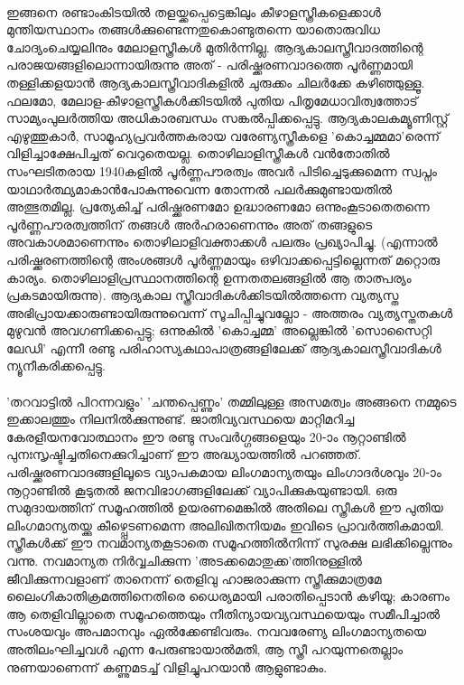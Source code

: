 \paragraph{}ഇങ്ങനെ രണ്ടാംകിടയിൽ തളയ്ക്കപ്പെട്ടെങ്കിലും കീഴാളസ്ത്രീകളെക്കാൾ മുന്തിയസ്ഥാനം തങ്ങൾക്കുണ്ടെന്നതുകൊണ്ടുതന്നെ യാതൊരുവിധ ചോദ്യംചെയ്യലിനും മേലാളസ്ത്രീകൾ മുതിർന്നില്ല. ആദ്യകാലസ്ത്രീവാദത്തിന്റെ പരാജയങ്ങളിലൊന്നായിരുന്നു അത് - പരിഷ്ക്കരണവാദത്തെ പൂർണ്ണമായി തള്ളിക്കളയാൻ ആദ്യകാലസ്ത്രീവാദികളിൽ ചുരുക്കം ചിലർക്കേ കഴിഞ്ഞുള്ളൂ. ഫലമോ, മേലാള-കീഴാളസ്ത്രീകൾക്കിടയിൽ പുതിയ പിതൃമേധാവിത്വത്തോട് സാമ്യംപുലർത്തിയ അധികാരബന്ധം സങ്കൽപ്പിക്കപ്പെട്ടു. ആദ്യകാലകമ്യൂണിസ്റ്റ് എഴുത്തുകാർ, സാമൂഹ്യപ്രവർത്തകരായ വരേണ്യസ്ത്രീകളെ 'കൊച്ചമ്മമാ'രെന്ന് വിളിച്ചാക്ഷേപിച്ചത് വെറുതെയല്ല. തൊഴിലാളിസ്ത്രീകൾ വൻതോതിൽ സംഘടിതരായ 1940കളിൽ പൂർണ്ണപൗരത്വം അവർ പിടിച്ചെടുക്കുമെന്ന സ്വപ്നം യാഥാർത്ഥ്യമാകാൻപോകുന്നുവെന്ന തോന്നൽ പലർക്കുമുണ്ടായതിൽ അത്ഭുതമില്ല. പ്രത്യേകിച്ച് പരിഷ്ക്കരണമോ ഉദ്ധാരണമോ ഒന്നുംകൂടാതെതന്നെ പൂർണ്ണപൗരത്വത്തിന് തങ്ങൾ അർഹരാണെന്നും അത് തങ്ങളുടെ അവകാശമാണെന്നും തൊഴിലാളിവക്താക്കൾ പലരും പ്രഖ്യാപിച്ചു. (എന്നാൽ പരിഷ്ക്കരണത്തിന്റെ അംശങ്ങൾ പൂർണ്ണമായും ഒഴിവാക്കപ്പെട്ടില്ലെന്നത് മറ്റൊരു കാര്യം. തൊഴിലാളിപ്രസ്ഥാനത്തിന്റെ ഉന്നതതലങ്ങളിൽ ആ താത്പര്യം പ്രകടമായിരുന്നു). ആദ്യകാല സ്ത്രീവാദികൾക്കിടയിൽത്തന്നെ വ്യത്യസ്ത അഭിപ്രായക്കാരുണ്ടായിരുന്നുവെന്ന് സൂചിപ്പിച്ചുവല്ലോ - അത്തരം വ്യത്യസ്തതകൾ മുഴുവൻ അവഗണിക്കപ്പെട്ടു; ഒന്നുകിൽ 'കൊച്ചമ്മ' അല്ലെങ്കിൽ 'സൊസൈറ്റി ലേഡി' എന്നീ രണ്ടു പരിഹാസ്യകഥാപാത്രങ്ങളിലേക്ക് ആദ്യകാലസ്ത്രീവാദികൾ ന്യൂനീകരിക്കപ്പെട്ടു.

\paragraph{}'തറവാട്ടിൽ പിറന്നവളും' 'ചന്തപ്പെണ്ണും' തമ്മിലുള്ള അസമത്വം അങ്ങനെ നമ്മുടെ ഇക്കാലത്തും നിലനിൽക്കുന്നുണ്ട്. ജാതിവ്യവസ്ഥയെ മാറ്റിമറിച്ച കേരളീയനവോത്ഥാനം ഈ രണ്ടു സംവർഗ്ഗങ്ങളെയും 20-ാം നൂറ്റാണ്ടിൽ പുനഃസൃഷ്ടിച്ചതിനെക്കുറിച്ചാണ് ഈ അദ്ധ്യായത്തിൽ പറഞ്ഞത്. പരിഷ്ക്കരണവാദങ്ങളിലൂടെ വ്യാപകമായ ലിംഗമാന്യതയും ലിംഗാദർശവും 20-ാം നൂറ്റാണ്ടിൽ കൂടുതൽ ജനവിഭാഗങ്ങളിലേക്ക് വ്യാപിക്കുകയുണ്ടായി. ഒരു സമുദായത്തിന് സമൂഹത്തിൽ ഉയരണമെങ്കിൽ അതിലെ സ്ത്രീകൾ ഈ പുതിയ ലിംഗമാന്യതയ്ക്കു കീഴ്പ്പെടണമെന്ന അലിഖിതനിയമം ഇവിടെ പ്രാവർത്തികമായി. സ്ത്രീകൾക്ക് ഈ നവമാന്യതകൂടാതെ സമൂഹത്തിൽനിന്ന് സുരക്ഷ ലഭിക്കില്ലെന്നും വന്നു. നവമാന്യത നിർവ്വചിക്കുന്ന 'അടക്കമൊതുക്ക'ത്തിനുള്ളിൽ ജീവിക്കുന്നവളാണ് താനെന്ന് തെളിവു ഹാജരാക്കുന്ന സ്ത്രീക്കുമാത്രമേ ലൈംഗികാതിക്രമത്തിനെതിരെ ധൈര്യമായി പരാതിപ്പെടാൻ കഴിയൂ; കാരണം ആ തെളിവില്ലാതെ സമൂഹത്തെയും നീതിന്യായവ്യവസ്ഥയെയും സമീപിച്ചാൽ സംശയവും അപമാനവും ഏൽക്കേണ്ടിവരും. നവവരേണ്യ ലിംഗമാന്യതയെ അതിലംഘിച്ചവൾ എന്ന പേരുണ്ടായാൽമതി, ആ സ്ത്രീ പറയുന്നതെല്ലാം നുണയാണെന്ന് കണ്ണുമടച്ച് വിളിച്ചുപറയാൻ ആളുണ്ടാകും. 

